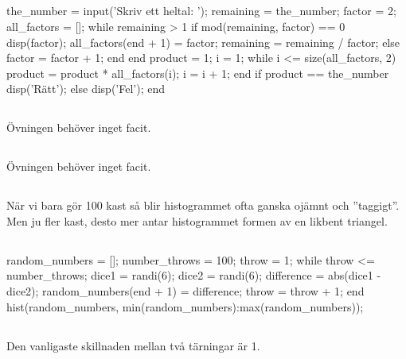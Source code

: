 \subsection*{}
\vspace{3pt}
\begin{matlab}
the_number = input('Skriv ett heltal: ');
remaining = the_number;
factor = 2;
all_factors = [];
while remaining > 1
	if mod(remaining, factor) == 0
		disp(factor);
		all_factors(end + 1) = factor;
		remaining = remaining / factor;
	else
		factor = factor + 1;
	end
end
product = 1;
i = 1;
while i <= size(all_factors, 2)
	product = product * all_factors(i);
	i = i + 1;
end
if product == the_number
	disp('Rätt');
else
	disp('Fel');
end

\end{matlab}


\subsection*{}
Övningen behöver inget facit.

\subsection*{}
Övningen behöver inget facit.

\subsection*{}
När vi bara gör 100 kast så blir histogrammet ofta ganska ojämnt och ''taggigt''. Men ju fler kast, desto mer antar histogrammet formen av en likbent triangel.
\subsection*{}
\vspace{3pt}
\begin{matlab}
random_numbers = [];
number_throws = 100; %
throw = 1;
while throw <= number_throws;
	dice1 = randi(6);
	dice2 = randi(6);
	difference = abs(dice1 - dice2);
	random_numbers(end + 1) = difference;
	throw = throw + 1;
end
hist(random_numbers, min(random_numbers):max(random_numbers));
\end{matlab}

\subsection*{}
Den vanligaste skillnaden mellan två tärningar är 1.

